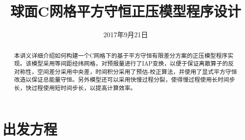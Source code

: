 \documentclass{ctexart}
\title{球面C网格平方守恒正压模型程序设计}
\date{2017年9月21日}
\begin{document}
\maketitle

\begin{abstract}
  本讲义详细介绍如何构建一个C网格下的基于平方守恒有限差分方案的正压模型程序实现。该模型采用等间距经纬网格，对预报量进行了IAP变换，以便于保证离散算子的反对称性，空间差分采用中央差，时间积分采用了预估-校正算法，并使用了显式平方守恒改造以保证总能量守恒。另外模型还可以采用快慢过程分裂，使得慢过程使用长时间步长，快过程使用短时间步长，以提高计算效率。
\end{abstract}

\section{出发方程}
\end{document}
